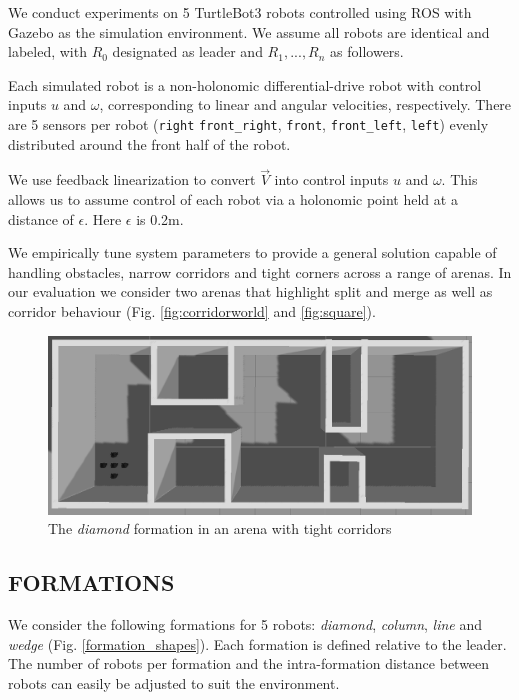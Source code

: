 \documentclass[letterpaper, 10 pt, conference]{ieeeconf}  %
\begin{document}
We conduct experiments on 5 TurtleBot3 \cite{turtlebot} robots controlled using ROS \cite{ros} with Gazebo \cite{gazebo} as the simulation environment. We assume all robots are identical and labeled, with $R_0$ designated as leader and $R_1,...,R_n$ as followers. 

Each simulated robot is a non-holonomic differential-drive robot with control inputs $u$ and $\omega$, corresponding to linear and angular velocities, respectively. There are 5 sensors per robot (\texttt{right} \texttt{front\_right}, \texttt{front}, \texttt{front\_left}, \texttt{left}) evenly distributed around the front half of the robot.

We use feedback linearization to convert $\vec{V}$ into control inputs $u$ and $\omega$. This allows us to assume control of each robot via a holonomic point held at a distance of $\epsilon$. Here $\epsilon$ is 0.2m.

We empirically tune system parameters to provide a general solution capable of handling obstacles, narrow corridors and tight corners across a range of arenas. In our evaluation we consider two arenas that highlight split and merge as well as corridor behaviour (Fig. \ref{fig:corridorworld} and \ref{fig:square}). 

\begin{figure}[thpb]
\centering
\includegraphics[width=\linewidth]{images/corridorworld.png}
\caption{The \textit{diamond} formation in an arena with tight corridors}
\label{corridorworld}
\end{figure}

\subsection{FORMATIONS}

We consider the following formations for 5 robots: \textit{diamond}, \textit{column}, \textit{line} and \textit{wedge} (Fig. \ref{formation_shapes}). Each formation is defined relative to the leader. The number of robots per formation and the intra-formation distance between robots can easily be adjusted to suit the environment.
\end{document}
